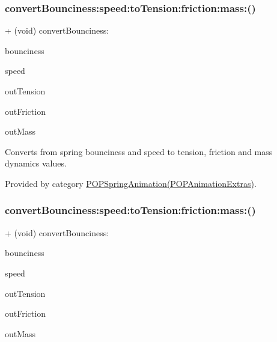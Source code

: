 \subsubsection{\texorpdfstring{convert\+Bounciness\+:speed\+:to\+Tension\+:friction\+:mass\+:()}{convertBounciness:speed:toTension:friction:mass:()}\hspace{0.1cm}{\footnotesize\ttfamily [2/3]}}
{\footnotesize\ttfamily + (void) convert\+Bounciness\+: \begin{DoxyParamCaption}\item[{(C\+G\+Float)}]{bounciness }\item[{speed:(C\+G\+Float)}]{speed }\item[{toTension:(C\+G\+Float $\ast$)}]{out\+Tension }\item[{friction:(C\+G\+Float $\ast$)}]{out\+Friction }\item[{mass:(C\+G\+Float $\ast$)}]{out\+Mass }\end{DoxyParamCaption}}

Converts from spring bounciness and speed to tension, friction and mass dynamics values. 

Provided by category \mbox{\hyperlink{category_p_o_p_spring_animation_07_p_o_p_animation_extras_08_a64169073c5afd559e939783a7f3f4065}{P\+O\+P\+Spring\+Animation(\+P\+O\+P\+Animation\+Extras)}}.

\mbox{\label{interface_p_o_p_spring_animation_a64169073c5afd559e939783a7f3f4065}} 
\subsubsection{\texorpdfstring{convert\+Bounciness\+:speed\+:to\+Tension\+:friction\+:mass\+:()}{convertBounciness:speed:toTension:friction:mass:()}\hspace{0.1cm}{\footnotesize\ttfamily [3/3]}}
{\footnotesize\ttfamily + (void) convert\+Bounciness\+: \begin{DoxyParamCaption}\item[{(C\+G\+Float)}]{bounciness }\item[{speed:(C\+G\+Float)}]{speed }\item[{toTension:(C\+G\+Float $\ast$)}]{out\+Tension }\item[{friction:(C\+G\+Float $\ast$)}]{out\+Friction }\item[{mass:(C\+G\+Float $\ast$)}]{out\+Mass }\end{DoxyParamCaption}}

